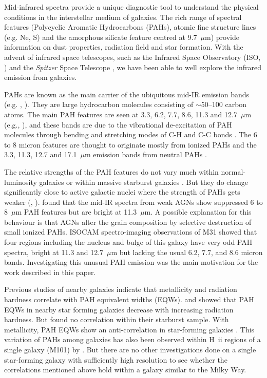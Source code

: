 Mid-infrared spectra provide a unique diagnostic tool to understand the physical conditions in the interstellar medium of galaxies. 
The rich range of spectral features (Polycyclic Aromatic Hydrocarbons (PAHs), atomic fine structure lines (e.g. Ne, S) and the
amorphous silicate feature centred at 9.7~$\mu$m) provide information on dust properties, radiation field and star formation. 
With the advent of infrared space telescopes, such as the Infrared Space Observatory (ISO, \citealt{Kessler1996}) and 
the {\em Spitzer} Space Telescope \citep{spitzer2004}, we have been able to well explore the infrared emission from galaxies. 

PAHs are known as the main carrier of the ubiquitous mid-IR emission bands (e.g. \citealt{Allamandola1989}, 
\citealt{Tielens2008}). They are large hydrocarbon molecules consisting of $\sim$50--100 carbon atoms. 
The main PAH features are seen at 3.3, 6.2, 7.7, 8.6, 11.3 and 12.7~$\mu $m (e.g.\citealt{Mattila1996}, \citealt{Peeters2002}), 
and these bands are due to the vibrational de-excitation of PAH molecules  through bending and stretching modes of C-H and C-C bonds \citep{Tielens:2005lr}. 
The 6 to 8 micron features are thought to originate mostly from ionized PAHs and the 3.3, 11.3, 12.7 and 17.1~$\mu$m 
emission bands from neutral PAHs \citep{Peeters2002}. 


The relative strengths of the PAH features do not vary much within normal-luminosity galaxies \citep{Smith:2007lr} or within 
massive starburst galaxies \citep{Brandl2006}. But they do change significantly close to active galactic nuclei where the 
strength of PAHs gets weaker (\citealt{Roche1991}, \citealt{Smith:2007lr}). \citet{Smith:2007lr}  found that the mid-IR 
spectra from weak AGNs show suppressed 6 to 8~$\mu$m PAH features but are bright at 11.3~$\mu$m. 
A possible explanation for this behaviour is that AGNs alter the grain composition by selective destruction of small ionized PAHs. 
ISOCAM spectro-imaging observations of M31\citep{1998Cesarsky} showed that four regions including the nucleus and bulge 
of this galaxy have very odd PAH spectra, bright at 11.3 and 12.7~$\mu$m but lacking the usual 6.2, 7.7, and 8.6 micron bands. 
Investigating this unusual PAH emission was the main motivation for the work described in this paper. 


Previous studies of nearby galaxies indicate that metallicity and radiation hardness correlate with PAH equivalent widths (EQWs). 
\citet{Smith:2007lr} and \citet{Engelbracht_2008} showed that PAH EQWs in nearby star forming galaxies  decrease with increasing radiation hardness. 
But  \citet{Brandl2006} found no correlation within their starburst sample.  With metallicity, PAH EQWs show an anti-correlation 
in star-forming galaxies \citep{Marble_2010}. This variation of PAHs among galaxies has also been observed within H~{\sc ii} regions 
of a single galaxy (M101) by \citet{Gordon:2008lr}. But there are no other investigations done on a single star-forming galaxy with 
sufficiently high resolution to see whether the correlations mentioned above hold within a galaxy similar to the Milky Way.



